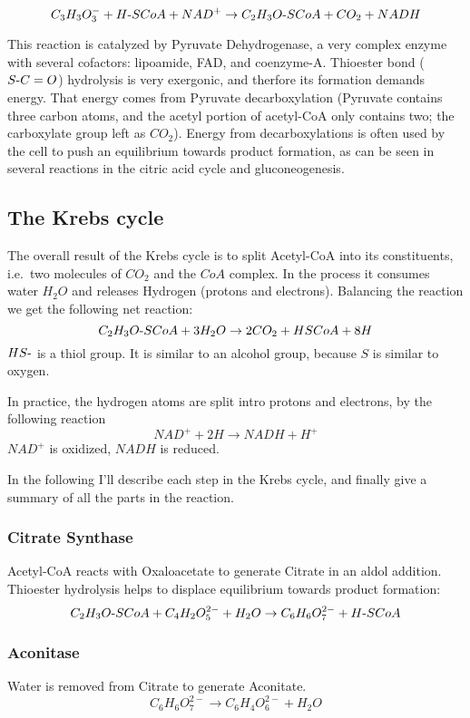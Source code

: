 \documentclass{article}
\def\mhyphen{{\hbox{-}}}
\begin{document}
\[
    C_3H_3O_3^- + H{\mhyphen}SCoA + NAD^+ \rightarrow
    C_2H_3O{\mhyphen}SCoA + CO_2 + NADH
\]

This reaction is catalyzed by Pyruvate Dehydrogenase, a very complex enzyme with several
cofactors: lipoamide, FAD, and coenzyme-A. Thioester bond ($S{\mhyphen}C=O$) hydrolysis is very exergonic,
and therfore its formation demands energy. That energy comes from Pyruvate decarboxylation
(Pyruvate contains three carbon atoms, and the acetyl portion of acetyl-CoA only contains
two; the carboxylate group left as $CO_2$). Energy from decarboxylations is often used by the
cell to push an equilibrium towards product formation, as can be seen in several reactions
in the citric acid cycle and gluconeogenesis.

\subsection{The Krebs cycle}
The overall result of the Krebs cycle is to split Acetyl-CoA into its constituents, i.e.\
two molecules of $CO_2$ and the $CoA$ complex. In the process it consumes water $H_2O$ and
releases Hydrogen (protons and electrons). Balancing the reaction we get the following
net reaction:
\[
    C_2H_3O{\mhyphen}SCoA + 3H_2O \rightarrow 2CO_2 + HSCoA + 8H
\]
$HS{\mhyphen}$ is a thiol group. It is similar to an alcohol group, because $S$ is similar to
oxygen.

In practice, the hydrogen atoms are split intro protons and electrons, by the following
reaction
\[
    NAD^+ + 2H \rightarrow NADH + H^+
\]
$NAD^+$ is oxidized, $NADH$ is reduced.

In the following I'll describe each step in the Krebs cycle, and finally give a summary of
all the parts in the reaction.

\subsubsection{Citrate Synthase}
Acetyl-CoA reacts with Oxaloacetate to generate Citrate in an aldol addition.
Thioester hydrolysis helps to displace equilibrium towards product formation:
\[
    C_2H_3O{\mhyphen}SCoA + C_4H_2O_5^{2-} + H_2O \rightarrow
    C_6H_6O_7^{2-} + H{\mhyphen}SCoA
\]

\subsubsection{Aconitase}
Water is removed from Citrate to generate Aconitate.
\[
    C_6H_6O_7^{2-} \rightarrow C_6H_4O_6^{2-} + H_2O
\]
\end{document}
